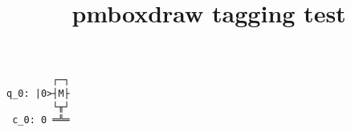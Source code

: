 \documentclass{article}
\title{pmboxdraw tagging test}
\begin{document}
\textupblock

\textSFxxi

\textltshade


\begin{verbatim}
        ┌─┐
q_0: |0>┤M├
        └╥┘
 c_0: 0 ═╩═
\end{verbatim}
\end{document}
